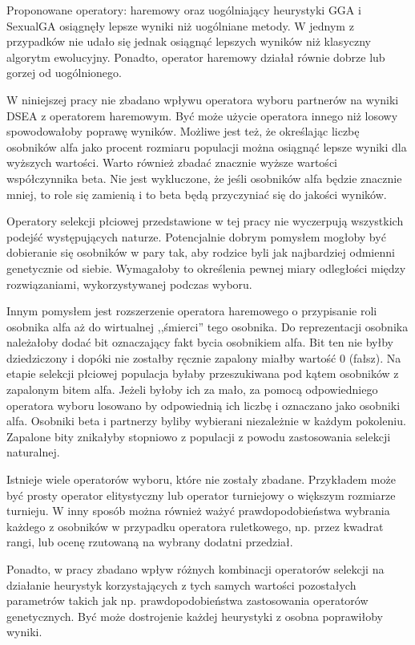 \documentclass[./FM_mgr.tex]{subfiles}
\begin{document}
Proponowane operatory: haremowy oraz uogólniający heurystyki GGA i SexualGA osiągnęły lepsze wyniki niż uogólniane metody.
W jednym z przypadków nie udało się jednak osiągnąć lepszych wyników niż klasyczny algorytm ewolucyjny.
Ponadto, operator haremowy działał równie dobrze lub gorzej od uogólnionego.

W niniejszej pracy nie zbadano wpływu operatora wyboru partnerów na wyniki DSEA z operatorem haremowym.
Być może użycie operatora innego niż losowy spowodowałoby poprawę wyników.
Możliwe jest też, że określając liczbę osobników alfa jako procent rozmiaru populacji można osiągnąć lepsze wyniki dla wyższych wartości.
Warto również zbadać znacznie wyższe wartości współczynnika beta.
Nie jest wykluczone, że jeśli osobników alfa będzie znacznie mniej, to role się zamienią i to beta będą przyczyniać się do jakości wyników.

Operatory selekcji płciowej przedstawione w tej pracy nie wyczerpują wszystkich podejść występujących naturze.
Potencjalnie dobrym pomysłem mogłoby być dobieranie się osobników w pary tak, aby rodzice byli jak najbardziej odmienni genetycznie od siebie.
Wymagałoby to określenia pewnej miary odległości między rozwiązaniami, wykorzystywanej podczas wyboru.

Innym pomysłem jest rozszerzenie operatora haremowego o przypisanie roli osobnika alfa aż do wirtualnej ,,śmierci'' tego osobnika.
Do reprezentacji osobnika należałoby dodać bit oznaczający fakt bycia osobnikiem alfa.
Bit ten nie byłby dziedziczony i dopóki nie zostałby ręcznie zapalony miałby wartość 0 (fałsz).
Na etapie selekcji płciowej populacja byłaby przeszukiwana pod kątem osobników z zapalonym bitem alfa.
Jeżeli byłoby ich za mało, za pomocą odpowiedniego operatora wyboru losowano by odpowiednią ich liczbę i oznaczano jako osobniki alfa.
Osobniki beta i partnerzy byliby wybierani niezależnie w każdym pokoleniu.
Zapalone bity znikałyby stopniowo z populacji z powodu zastosowania selekcji naturalnej.

Istnieje wiele operatorów wyboru, które nie zostały zbadane.
Przykładem może być prosty operator elitystyczny lub operator turniejowy o większym rozmiarze turnieju.
W inny sposób można również ważyć prawdopodobieństwa wybrania każdego z osobników w przypadku operatora ruletkowego, np. przez kwadrat rangi, lub ocenę rzutowaną na wybrany dodatni przedział.

Ponadto, w pracy zbadano wpływ różnych kombinacji operatorów selekcji na działanie heurystyk korzystających z tych samych wartości pozostałych parametrów takich jak np. prawdopodobieństwa zastosowania operatorów genetycznych.
Być może dostrojenie każdej heurystyki z osobna poprawiłoby wyniki.
\end{document}
